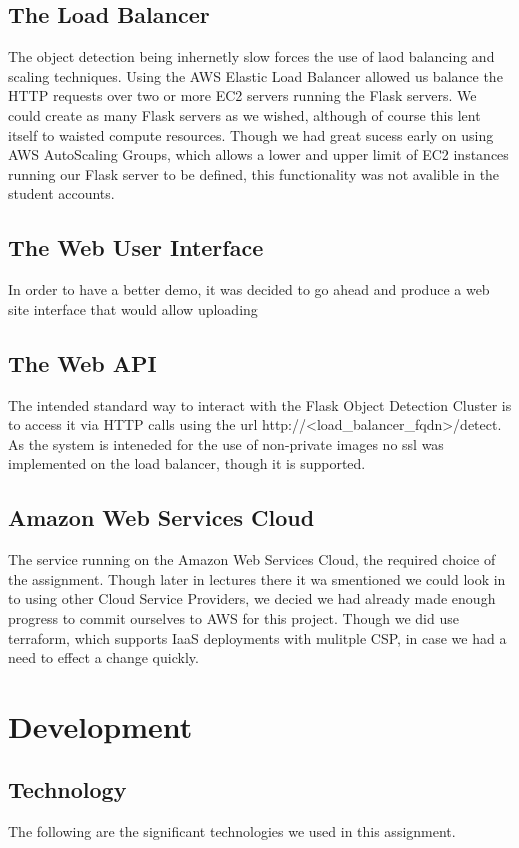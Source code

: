 \documentclass[conference]{IEEEtran}
\begin{document}
\subsection{The Load Balancer}
The object detection being inhernetly slow forces the use of laod balancing and scaling techniques. Using the AWS Elastic Load Balancer allowed us balance the HTTP requests over two or more EC2 servers running the Flask servers. We could create as many Flask servers as we wished, although of course this lent itself to waisted compute resources. Though we had great sucess early on using AWS AutoScaling Groups, which allows a lower and upper limit of EC2 instances running our Flask server to be defined, this functionality was not avalible in the student accounts.
\subsection{The Web User Interface}
In order to have a better demo, it was decided to go ahead and produce a web site interface that would allow uploading 
\subsection{The Web API}
The intended standard way to interact with the Flask Object Detection Cluster is to access it via HTTP calls using the url http://\textless load\_balancer\_fqdn\textgreater/detect. As the system is inteneded for the use of non-private images no ssl was implemented on the load balancer, though it is supported.
\subsection{Amazon Web Services Cloud}
The service running on the Amazon Web Services Cloud, the required choice of the assignment. Though later in lectures there it wa smentioned we could look in to using other Cloud Service Providers, we decied we had already made enough progress to commit ourselves to AWS for this project. Though we did use terraform, which supports IaaS deployments with mulitple CSP, in case we had a need to effect a change quickly.
\section{Development}
\subsection{Technology}
The following are the significant technologies we used in this assignment.
\end{document}
